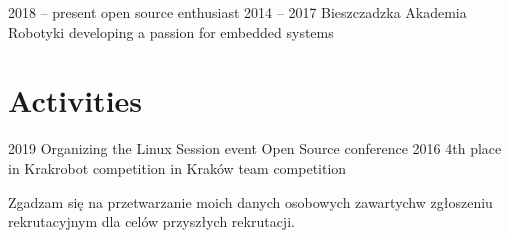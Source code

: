 \documentclass[]{cv-style}
\begin{document}
\begin{entrylist}
\entry
{2018 -- present}
{}
{open source enthusiast}
{\vspace{0.4cm}}
\entry
{2014 -- 2017}
{\quad Bieszczadzka Akademia Robotyki}
{developing a passion for embedded systems}
{\vspace{0.3cm}}

\end{entrylist}


\section{Activities}

\begin{entrylist}
\entry
{2019}
{Organizing the Linux Session event}
{Open Source conference}
{}
\entry
{2016}
{4th place in Krakrobot competition in Kraków}
{team competition}


\end{entrylist}


\vspace{4cm}



{\footnotesize Zgadzam się na przetwarzanie moich danych osobowych zawartych\newline w  zgłoszeniu rekrutacyjnym dla celów przyszłych rekrutacji.}
\end{document}
